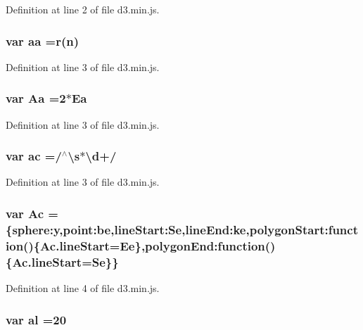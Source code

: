 Definition at line 2 of file d3.\+min.\+js.

\subsubsection[{aa}]{\setlength{\rightskip}{0pt plus 5cm}var aa ={\bf r}({\bf n})}\label{d3_8min_8js_a2160ab024696353352f1159edc0002ea}


Definition at line 3 of file d3.\+min.\+js.

\subsubsection[{Aa}]{\setlength{\rightskip}{0pt plus 5cm}var Aa =2$\ast${\bf Ea}}\label{d3_8min_8js_aacbc7cf31d45fa28c4fb99f3a64343c4}


Definition at line 3 of file d3.\+min.\+js.

\subsubsection[{ac}]{\setlength{\rightskip}{0pt plus 5cm}var ac =/$^\wedge$\textbackslash{}s$\ast$\textbackslash{}{\bf d}+/}\label{d3_8min_8js_a0806db4b977836139018f016e04160a6}


Definition at line 3 of file d3.\+min.\+js.

\subsubsection[{Ac}]{\setlength{\rightskip}{0pt plus 5cm}var Ac =\{sphere\+:y,point\+:be,line\+Start\+:\+Se,line\+End\+:ke,polygon\+Start\+:function()\{Ac.\+line\+Start=Ee\},polygon\+End\+:function()\{Ac.\+line\+Start=Se\}\}}\label{d3_8min_8js_a008b14fcbcc468093b965e8d41ab9d26}


Definition at line 4 of file d3.\+min.\+js.

\subsubsection[{al}]{\setlength{\rightskip}{0pt plus 5cm}var al =20}\label{d3_8min_8js_ae2ea74dcf81546b8c0e6263f35f3e52a}


